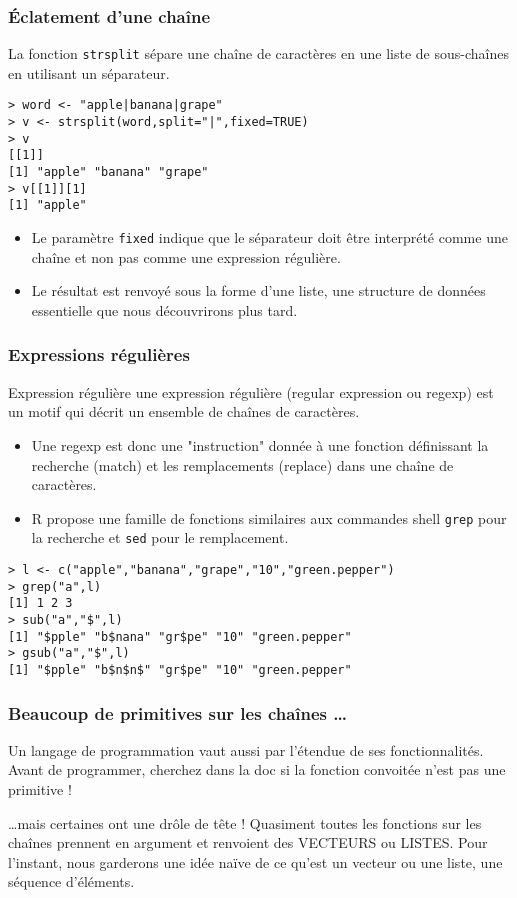 \documentclass[10pt]{beamer}
\begin{document}
\begin{frame}[fragile]
  \frametitle{Éclatement d’une chaîne}
La fonction \alert{\texttt{strsplit}} sépare une chaîne de caractères en une liste de sous-chaînes en utilisant un séparateur.  
\begin{lstlisting}
> word <- "apple|banana|grape"
> v <- strsplit(word,split="|",fixed=TRUE)
> v
[[1]]
[1] "apple" "banana" "grape"
> v[[1]][1]
[1] "apple"  
\end{lstlisting}

\begin{itemize}
\item Le paramètre \texttt{fixed} indique que le séparateur doit être interprété comme une chaîne et non pas comme une expression régulière.
\item Le résultat est renvoyé sous la forme d’une liste, une structure de données essentielle que nous découvrirons plus tard.
\end{itemize}
\end{frame}
\begin{frame}[fragile]
  \frametitle{Expressions régulières}
  \begin{alertblock}{Expression régulière}
    une expression régulière (regular expression ou regexp) est un motif qui décrit un ensemble de chaînes de caractères. \\
\end{alertblock}
\begin{itemize}
\item Une regexp est donc une "instruction" donnée à une fonction définissant la recherche (match) et les remplacements (replace) dans une chaîne de caractères.
\item R propose une famille de fonctions similaires aux commandes shell \texttt{grep} pour la recherche et \texttt{sed} pour le remplacement.  
\end{itemize}
\begin{lstlisting}
> l <- c("apple","banana","grape","10","green.pepper")
> grep("a",l)
[1] 1 2 3
> sub("a","$",l)
[1] "$pple" "b$nana" "gr$pe" "10" "green.pepper"
> gsub("a","$",l)
[1] "$pple" "b$n$n$" "gr$pe" "10" "green.pepper"  
\end{lstlisting}
\end{frame}

\begin{frame}
  \frametitle{Beaucoup de primitives sur les chaînes \dots}
  Un langage de programmation vaut aussi par l'étendue de ses fonctionnalités.
  Avant de programmer, cherchez dans la doc si la fonction convoitée n'est pas une primitive !

  \begin{block}{\dots mais certaines ont une drôle de tête !}
    Quasiment toutes les fonctions sur les chaînes prennent en argument et renvoient des VECTEURS ou LISTES.
    Pour l'instant, nous garderons une idée naïve de ce qu'est un vecteur ou une liste, une séquence d’éléments.    
  \end{block}

\end{frame}
\end{document}
